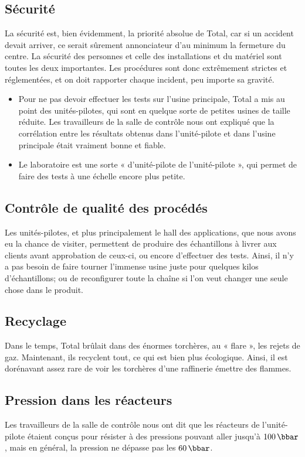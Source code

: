 \subsection{Sécurité}
La sécurité est, bien évidemment, la priorité absolue de Total, car si un accident devait arriver, ce serait sûrement annonciateur d'au minimum la fermeture du centre. La sécurité des personnes et celle des installations et du matériel sont toutes les deux importantes. Les procédures sont donc extrêmement strictes et réglementées, et on doit rapporter chaque incident, peu importe sa gravité.
\begin{itemize}
\item Pour ne pas devoir effectuer les tests sur l'usine principale, Total a mis au point des unités-pilotes, qui sont en quelque sorte de petites usines de taille réduite.  Les travailleurs de la salle de contrôle nous ont expliqué que la corrélation entre les résultats obtenus dans l'unité-pilote et dans l'usine principale était vraiment bonne et fiable.
\item Le laboratoire est une sorte « d'unité-pilote de l'unité-pilote », qui permet de faire des tests à une échelle encore plus petite.
\end{itemize}

\subsection{Contrôle de qualité des procédés}
Les unités-pilotes, et plus principalement le hall des applications, que nous avons eu la chance de visiter, permettent de produire des échantillons à livrer aux clients avant approbation de ceux-ci, ou encore d'effectuer des tests. Ainsi, il n'y a pas besoin de faire tourner l'immense usine juste pour quelques kilos d'échantillons; ou de reconfigurer toute la chaîne si l'on veut changer une seule chose dans le produit.

\subsection{Recyclage}
Dans le temps, Total brûlait dans des énormes torchères, au « flare », les rejets de gaz. Maintenant, ils recyclent tout, ce qui est bien plus écologique. Ainsi, il est dorénavant assez rare de voir les torchères d'une raffinerie émettre des flammes.

\subsection{Pression dans les réacteurs}
Les travailleurs de la salle de contrôle nous ont dit que les réacteurs de l'unité-pilote étaient conçus pour résister à des pressions pouvant aller jusqu'à $100\,\bbar$, mais en général, la pression ne dépasse pas les $60\,\bbar$.

